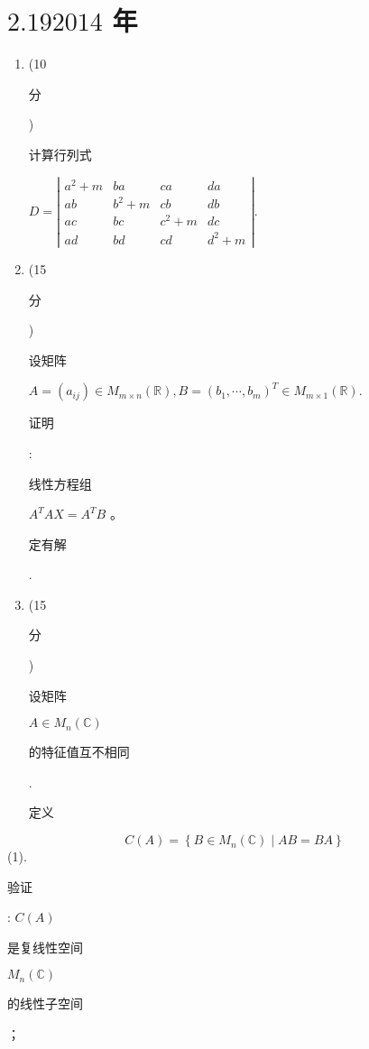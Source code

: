 \documentclass[10pt]{article}
\begin{document}
\section{$2.192014$ 年}
\begin{enumerate}
  \item (10 \begin{CJK}{UTF8}{mj}分\end{CJK}) \begin{CJK}{UTF8}{mj}计算行列式\end{CJK} $D=\left|\begin{array}{cccc}a^{2}+m & b a & c a & d a \\ a b & b^{2}+m & c b & d b \\ a c & b c & c^{2}+m & d c \\ a d & b d & c d & d^{2}+m\end{array}\right|$.

  \item (15 \begin{CJK}{UTF8}{mj}分\end{CJK}) \begin{CJK}{UTF8}{mj}设矩阵\end{CJK} $A=\left(a_{i j}\right) \in M_{m \times n}(\mathbb{R}), B=\left(b_{1}, \cdots, b_{m}\right)^{T} \in M_{m \times 1}(\mathbb{R})$. \begin{CJK}{UTF8}{mj}证明\end{CJK}: \begin{CJK}{UTF8}{mj}线性方程组\end{CJK} $A^{T} A X=A^{T} B$ 。\begin{CJK}{UTF8}{mj}定有解\end{CJK}.

  \item (15 \begin{CJK}{UTF8}{mj}分\end{CJK}) \begin{CJK}{UTF8}{mj}设矩阵\end{CJK} $A \in M_{n}(\mathbb{C})$ \begin{CJK}{UTF8}{mj}的特征值互不相同\end{CJK}. \begin{CJK}{UTF8}{mj}定义\end{CJK}

\end{enumerate}
$$
C(A)=\left\{B \in M_{n}(\mathbb{C}) \mid A B=B A\right\}
$$
(1). \begin{CJK}{UTF8}{mj}验证\end{CJK}: $C(A)$ \begin{CJK}{UTF8}{mj}是复线性空间\end{CJK} $M_{n}(\mathbb{C})$ \begin{CJK}{UTF8}{mj}的线性子空间\end{CJK}；
\end{document}
